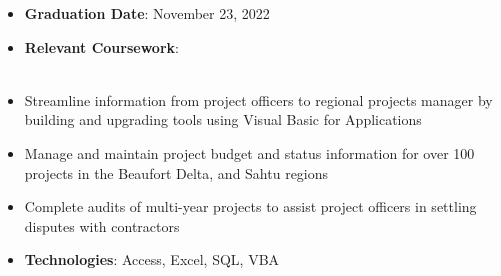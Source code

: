 \documentclass[10pt, letterpaper, ragged2e, withhyper]{altacv}
\begin{document}
\tagline{}

\makecvheader


\begin{paracol}{2}
        \begin{itemize}
            \item \textbf{Graduation Date}: November 23, 2022
            \item \textbf{Relevant Coursework}: \vspace*{1.25pt} \\
                
             \\
        \end{itemize}


            \begin{itemize}
                 \item Streamline information from project officers to regional projects manager by building and upgrading tools 
                 using Visual Basic for Applications
                \item Manage and maintain project budget and status information for over 100 projects in the Beaufort Delta, and Sahtu regions  
                \item Complete audits of multi-year projects to assist project officers in settling disputes with contractors 
                \item \textbf{Technologies}: Access, Excel, SQL, VBA 
            \end{itemize}


\end{paracol}
\end{document}
